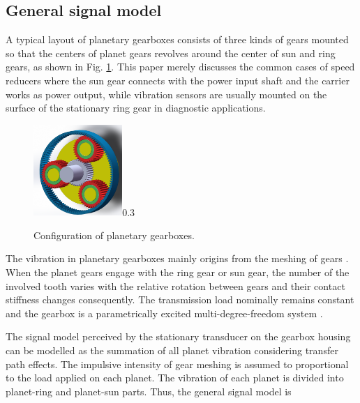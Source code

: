\documentclass[a4paper,fleqn]{cas-sc}%
\begin{document}
\subsection{General signal model}
\par A typical layout of planetary gearboxes consists of three kinds of gears mounted so that the centers of planet gears revolves around the center of sun and ring gears, as shown in Fig. \ref{fig:planetary_gearbox_layout}. This paper merely discusses the common cases of speed reducers where the sun gear connects with the power input shaft and the carrier works as power output, while vibration sensors are usually mounted on the surface of the stationary ring gear in diagnostic applications. 
\begin{figure}[pos=htbp]
    \centering
    \begin{annotate}{\includegraphics[width=0.3\textwidth]{Planetary_Gearbox.PNG}}{0.3}
    \end{annotate}
    \caption{Configuration of planetary gearboxes.}
    \label{fig:planetary_gearbox_layout}
\end{figure}
\par The vibration in planetary gearboxes mainly origins from the meshing of gears \cite{Velex1996}. When the planet gears engage with the ring gear or sun gear, the number of the involved tooth varies with the relative rotation between gears and their contact stiffness changes consequently. The transmission load nominally remains constant and the gearbox is a parametrically excited multi-degree-freedom system \cite{Acar2019}. 
\par The signal model perceived by the stationary transducer on the gearbox housing can be modelled as the summation of all planet vibration considering transfer path effects. The impulsive intensity of gear meshing is assumed to proportional to the load applied on each planet. The vibration of each planet is divided into planet-ring and planet-sun parts. Thus, the general signal model is
\end{document}
